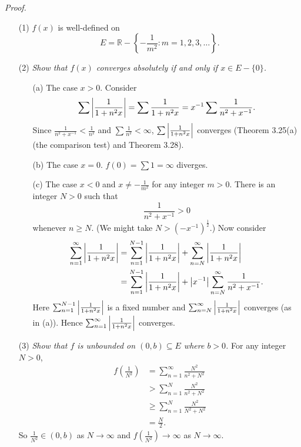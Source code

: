 \documentclass{article}
\begin{document}
\emph{Proof.}
\begin{enumerate}
\item[(1)]
  $f(x)$ is well-defined on
  \[
    E = \mathbb{R} - \left\{ -\frac{1}{m^2} : m = 1,2,3,\ldots \right\}.
  \]

\item[(2)]
  \emph{Show that $f(x)$ converges absolutely if and only if $x \in E - \{0\}$.}
  \begin{enumerate}
    \item[(a)]
    The case $x > 0$.
    Consider
    \[
      \sum \abs{\frac{1}{1+n^2x}}
      = \sum \frac{1}{1+n^2x}
      = x^{-1} \sum \frac{1}{n^2 + x^{-1}}.
    \]
    Since $\frac{1}{n^2 + x^{-1}} < \frac{1}{n^2}$ and $\sum \frac{1}{n^2} < \infty$,
    $\sum \abs{\frac{1}{1+n^2x}}$ converges
    (Theorem 3.25(a)(the comparison test) and Theorem 3.28).

    \item[(b)]
    The case $x = 0$.
    $f(0) = \sum 1 = \infty$ diverges.

    \item[(c)]
    The case $x < 0$ and $x \neq -\frac{1}{m^2}$ for any integer $m > 0$.
    There is an integer $N > 0$ such that
    \[
      \frac{1}{n^2 + x^{-1}} > 0
    \]
    whenever $n \geq N$.
    (We might take $N > (-x^{-1})^{\frac{1}{2}}$.)
    Now consider
    \begin{align*}
      \sum_{n=1}^{\infty} \abs{\frac{1}{1+n^2x}}
      &= \sum_{n=1}^{N-1} \abs{\frac{1}{1+n^2x}}
        + \sum_{n=N}^{\infty} \abs{\frac{1}{1+n^2x}} \\
      &= \sum_{n=1}^{N-1} \abs{\frac{1}{1+n^2x}}
        + \abs{x^{-1}} \sum_{n=N}^{\infty} \frac{1}{n^2 + x^{-1}}.
    \end{align*}
    Here $\sum_{n=1}^{N-1} \abs{\frac{1}{1+n^2x}}$ is a fixed number
    and $\sum_{n=N}^{\infty} \abs{\frac{1}{1+n^2x}}$ converges
    (as in (a)).
    Hence $\sum_{n=1}^{\infty} \abs{\frac{1}{1+n^2x}}$ converges.
  \end{enumerate}

\item[(3)]
  \emph{Show that $f$ is unbounded on $(0,b) \subseteq E$ where $b > 0$.}
  For any integer $N > 0$,
  \begin{align*}
    f\left(\frac{1}{N^2}\right)
    &= \sum_{n=1}^{\infty} \frac{N^2}{n^2 + N^2} \\
    &> \sum_{n=1}^{N} \frac{N^2}{n^2 + N^2} \\
    &\geq \sum_{n=1}^{N} \frac{N^2}{N^2 + N^2} \\
    &= \frac{N}{2}.
  \end{align*}
  So $\frac{1}{N^2} \in (0,b)$ as $N \to \infty$ and
  $f\left(\frac{1}{N^2}\right) \to \infty$ as $N \to \infty$.


\end{enumerate}
\end{document}

